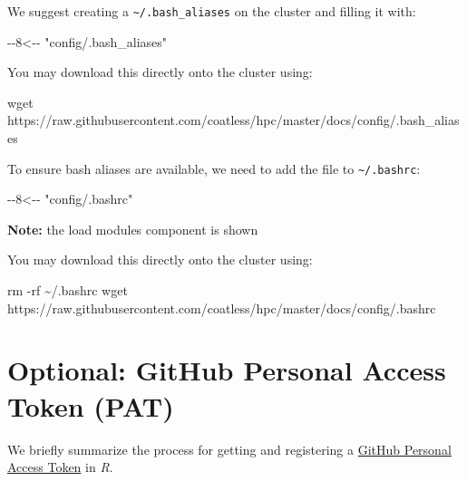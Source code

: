 \documentclass[
  letterpaper,
  DIV=11,
  numbers=noendperiod]{scrreport}
\newenvironment{Shaded}{\begin{snugshade}}{\end{snugshade}}
\newcommand{\AttributeTok}[1]{\textcolor[rgb]{0.40,0.45,0.13}{#1}}
\newcommand{\ExtensionTok}[1]{\textcolor[rgb]{0.00,0.23,0.31}{#1}}
\newcommand{\FunctionTok}[1]{\textcolor[rgb]{0.28,0.35,0.67}{#1}}
\newcommand{\NormalTok}[1]{\textcolor[rgb]{0.00,0.23,0.31}{#1}}
\newcommand{\OperatorTok}[1]{\textcolor[rgb]{0.37,0.37,0.37}{#1}}
\newcommand{\StringTok}[1]{\textcolor[rgb]{0.13,0.47,0.30}{#1}}
\begin{document}
We suggest creating a \texttt{\textasciitilde{}/.bash\_aliases} on the
cluster and filling it with:

\begin{Shaded}
\begin{Highlighting}[]
\ExtensionTok{{-}{-}8}\OperatorTok{\textless{}}\NormalTok{{-}{-} }\StringTok{"config/.bash\_aliases"}
\end{Highlighting}
\end{Shaded}

You may download this directly onto the cluster using:

\begin{Shaded}
\begin{Highlighting}[]
\FunctionTok{wget}\NormalTok{ https://raw.githubusercontent.com/coatless/hpc/master/docs/config/.bash\_aliases}
\end{Highlighting}
\end{Shaded}

To ensure bash aliases are available, we need to add the file to
\texttt{\textasciitilde{}/.bashrc}:

\begin{Shaded}
\begin{Highlighting}[]
\ExtensionTok{{-}{-}8}\OperatorTok{\textless{}}\NormalTok{{-}{-} }\StringTok{"config/.bashrc"}
\end{Highlighting}
\end{Shaded}

\textbf{Note:} the load modules component is shown

You may download this directly onto the cluster using:

\begin{Shaded}
\begin{Highlighting}[]
\FunctionTok{rm} \AttributeTok{{-}rf}\NormalTok{ \textasciitilde{}/.bashrc}
\FunctionTok{wget}\NormalTok{ https://raw.githubusercontent.com/coatless/hpc/master/docs/config/.bashrc}
\end{Highlighting}
\end{Shaded}

\hypertarget{optional-github-personal-access-token-pat}{%
\section{Optional: GitHub Personal Access Token
(PAT)}\label{optional-github-personal-access-token-pat}}

We briefly summarize the process for getting and registering a
\href{https://help.github.com/articles/creating-an-access-token-for-command-line-use/}{GitHub
Personal Access Token} in \emph{R}.
\end{document}

